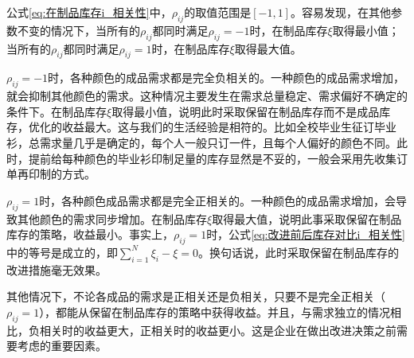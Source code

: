 公式\ref{eq:在制品库存i_相关性}中，$\rho_{ij}$的取值范围是$[-1,1]$。容易发现，在其他参数不变的情况下，当所有的$\rho_{ij}$都同时满足$\rho_{ij}=-1$时，在制品库存$\xi$取得最小值；当所有的$\rho_{ij}$都同时满足$\rho_{ij}=1$时，在制品库存$\xi$取得最大值。

$\rho_{ij}=-1$时，各种颜色的成品需求都是完全负相关的。一种颜色的成品需求增加，就会抑制其他颜色的需求。这种情况主要发生在需求总量稳定、需求偏好不确定的条件下。在制品库存$\xi$取得最小值，说明此时采取保留在制品库存而不是成品库存，优化的收益最大。这与我们的生活经验是相符的。比如全校毕业生征订毕业衫，总需求量几乎是确定的，每个人一般只订一件，且每个人偏好的颜色不同。此时，提前给每种颜色的毕业衫印制足量的库存显然是不妥的，一般会采用先收集订单再印制的方式。

$\rho_{ij}=1$时，各种颜色成品需求都是完全正相关的。一种颜色的成品需求增加，会导致其他颜色的需求同步增加。在制品库存$\xi$取得最大值，说明此事采取保留在制品库存的策略，收益最小。事实上，$\rho_{ij}=1$时，公式\ref{eq:改进前后库存对比i_相关性}中的等号是成立的，即$\sum_{i=1}^N\xi_i - \xi = 0$。换句话说，此时采取保留在制品库存的改进措施毫无效果。

其他情况下，不论各成品的需求是正相关还是负相关，只要不是完全正相关（$\rho_{ij}=1$），都能从保留在制品库存的策略中获得收益。并且，与需求独立的情况相比，负相关时的收益更大，正相关时的收益更小。这是企业在做出改进决策之前需要考虑的重要因素。



